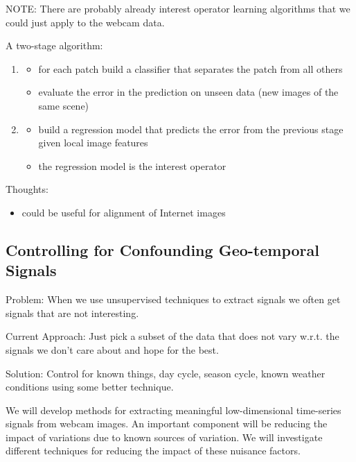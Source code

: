 NOTE: There are probably already interest operator learning algorithms that
we could just apply to the webcam data.

A two-stage algorithm:

\begin{enumerate}

  \item 
    \begin{itemize}
      \item for each patch build a classifier that separates the patch
        from all others
      \item evaluate the error in the prediction on unseen data (new
        images of the same scene)
    \end{itemize}

  \item
    \begin{itemize}
      \item build a regression model that predicts the error from the
        previous stage given local image features
      \item the regression model is the interest operator
    \end{itemize}

\end{enumerate}

Thoughts:
\begin{itemize}

  \item could be useful for alignment of Internet images

\end{itemize}

\subsection{Controlling for Confounding Geo-temporal Signals}
\label{sec:signalsControlling}

Problem: When we use unsupervised techniques to extract signals we
often get signals that are not interesting.  

Current Approach: Just pick a subset of the data that does not vary
w.r.t. the signals we don't care about and hope for the best.

Solution: Control for known things, day cycle, season cycle, known weather
conditions using some better technique.

We will develop methods for extracting meaningful low-dimensional
time-series signals from webcam images.  An important component will
be reducing the impact of variations due to known sources of
variation.  We will investigate different techniques for reducing the
impact of these nuisance factors.

